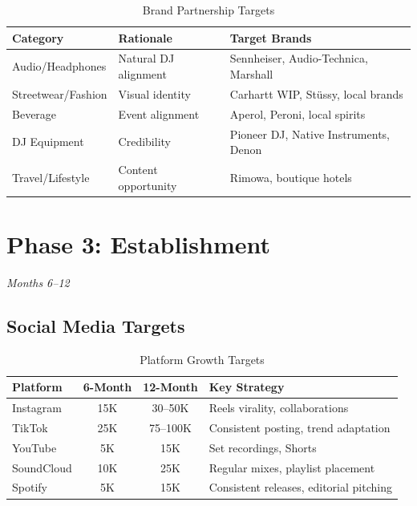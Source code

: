 \documentclass[11pt,a4paper]{article}
\begin{document}
\begin{table}[h!]
\centering
\renewcommand{\arraystretch}{1.3}
\begin{tabularx}{\textwidth}{l l X}
\toprule
\rowcolor{amaraprimary}
\textcolor{amaracream}{\textbf{Category}} & \textcolor{amaracream}{\textbf{Rationale}} & \textcolor{amaracream}{\textbf{Target Brands}} \\
\midrule
Audio/Headphones & Natural DJ alignment & Sennheiser, Audio-Technica, Marshall \\
Streetwear/Fashion & Visual identity & Carhartt WIP, Stüssy, local brands \\
Beverage & Event alignment & Aperol, Peroni, local spirits \\
DJ Equipment & Credibility & Pioneer DJ, Native Instruments, Denon \\
Travel/Lifestyle & Content opportunity & Rimowa, boutique hotels \\
\bottomrule
\end{tabularx}
\caption{Brand Partnership Targets}
\end{table}

\newpage
\section{Phase 3: Establishment}
\textit{Months 6--12}

\subsection{Social Media Targets}

\begin{table}[h!]
\centering
\renewcommand{\arraystretch}{1.3}
\begin{tabularx}{\textwidth}{l c c X}
\toprule
\rowcolor{amaraprimary}
\textcolor{amaracream}{\textbf{Platform}} & \textcolor{amaracream}{\textbf{6-Month}} & \textcolor{amaracream}{\textbf{12-Month}} & \textcolor{amaracream}{\textbf{Key Strategy}} \\
\midrule
Instagram & 15K & 30--50K & Reels virality, collaborations \\
TikTok & 25K & 75--100K & Consistent posting, trend adaptation \\
YouTube & 5K & 15K & Set recordings, Shorts \\
SoundCloud & 10K & 25K & Regular mixes, playlist placement \\
Spotify & 5K & 15K & Consistent releases, editorial pitching \\
\bottomrule
\end{tabularx}
\caption{Platform Growth Targets}
\end{table}
\end{document}
